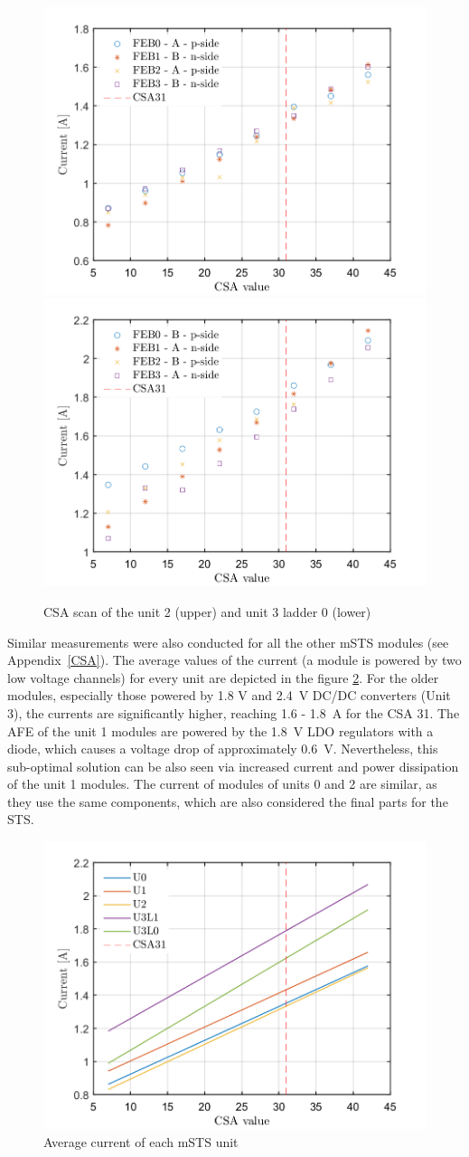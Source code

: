 \begin{figure}[h!]
\centering
\includegraphics[width=0.6\columnwidth]{Chapter6/DCS/images/U2CSABIAS.png}
\includegraphics[width=0.6\columnwidth]{Chapter6/DCS/images/U3L1CSABIAS.png}
\caption{CSA scan of the unit 2 (upper) and unit 3 ladder 0 (lower)}
\label{fig_power2}
\end{figure}
\newpage
Similar measurements were also conducted for all the other \gls{mSTS} modules (see Appendix~\ref{CSA}). The average values of the current (a module is powered by two low voltage channels) for every unit are depicted in the figure \ref{fig_avg}. For the older modules, especially those powered by 1.8 V and 2.4~V DC/DC converters (Unit 3), the currents are significantly higher, reaching 1.6 - 1.8~A for the \gls{CSA} 31. The \gls{AFE} of the unit 1 modules are powered by the 1.8~V \gls{LDO} regulators with a diode, which causes a voltage drop of approximately 0.6~V. Nevertheless, this sub-optimal solution can be also seen via increased current and power dissipation of the unit 1 modules. The current of modules of units 0 and 2 are similar, as they use the same components, which are also considered the final parts for the \gls{STS}.

\begin{figure}[h!]
\centering
\includegraphics[width=0.6\columnwidth]{Chapter6/DCS/images/units.png}
\caption{Average current of each \gls{mSTS} unit}
\label{fig_avg}
\end{figure}

